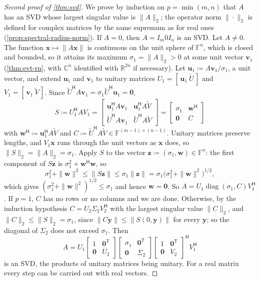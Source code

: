 \begin{proof}[Second proof of \cref{thm:svd}]
We prove by induction on $p=\min(m,n)$ that $A$ has an SVD whose largest singular value is $\|A\|_2$; the operator norm $\|\cdot\|_2$ is defined for complex matrices by the same supremum as for real ones (\cref{prop:spectral-radius-norm}). If $A=0$, then $A=I_m0I_n$ is an SVD. Let $A\ne0$. The function $\mathbf x\mapsto\|A\mathbf x\|$ is continuous on the unit sphere of $\mathbb F^n$, which is closed and bounded, so it attains its maximum $\sigma_1=\|A\|_2>0$ at some unit vector $\mathbf v_1$ (\cref{thm:evt-rn}, with $\mathbb C^n$ identified with $\mathbb R^{2n}$ if necessary). Let $\mathbf u_1\coloneqq A\mathbf v_1/\sigma_1$, a unit vector, and extend $\mathbf u_1$ and $\mathbf v_1$ to unitary matrices $U_1=[\,\mathbf u_1\ \tilde U\,]$ and $V_1=[\,\mathbf v_1\ \tilde V\,]$. Since $\tilde U^{\mathsf H}A\mathbf v_1=\sigma_1\tilde U^{\mathsf H}\mathbf u_1=\mathbf 0$,
\[
S\coloneqq U_1^{\mathsf H}AV_1=\begin{bmatrix}\mathbf u_1^{\mathsf H}A\mathbf v_1&\mathbf u_1^{\mathsf H}A\tilde V\\\tilde U^{\mathsf H}A\mathbf v_1&\tilde U^{\mathsf H}A\tilde V\end{bmatrix}=\begin{bmatrix}\sigma_1&\mathbf w^{\mathsf H}\\\mathbf 0&C\end{bmatrix}
\]
with $\mathbf w^{\mathsf H}\coloneqq\mathbf u_1^{\mathsf H}A\tilde V$ and $C\coloneqq\tilde U^{\mathsf H}A\tilde V\in\mathbb F^{(m-1)\times(n-1)}$. Unitary matrices preserve lengths, and $V_1\mathbf x$ runs through the unit vectors as $\mathbf x$ does, so $\|S\|_2=\|A\|_2=\sigma_1$. Apply $S$ to the vector $\mathbf z\coloneqq(\sigma_1,\mathbf w)\in\mathbb F^n$: the first component of $S\mathbf z$ is $\sigma_1^2+\mathbf w^{\mathsf H}\mathbf w$, so
\[
\sigma_1^2+\|\mathbf w\|^2\le\|S\mathbf z\|\le\sigma_1\|\mathbf z\|=\sigma_1\bigl(\sigma_1^2+\|\mathbf w\|^2\bigr)^{1/2},
\]
which gives $(\sigma_1^2+\|\mathbf w\|^2)^{1/2}\le\sigma_1$ and hence $\mathbf w=\mathbf 0$. So $A=U_1\operatorname{diag}(\sigma_1,C)V_1^{\mathsf H}$. If $p=1$, $C$ has no rows or no columns and we are done. Otherwise, by the induction hypothesis $C=U_2\Sigma_2V_2^{\mathsf H}$ with the largest singular value $\|C\|_2$, and $\|C\|_2\le\|S\|_2=\sigma_1$, since $\|C\mathbf y\|\le\|S(0,\mathbf y)\|$ for every $\mathbf y$; so the diagonal of $\Sigma_2$ does not exceed $\sigma_1$. Then
\[
A=U_1\begin{bmatrix}1&\mathbf 0^{\mathsf T}\\\mathbf 0&U_2\end{bmatrix}\begin{bmatrix}\sigma_1&\mathbf 0^{\mathsf T}\\\mathbf 0&\Sigma_2\end{bmatrix}\begin{bmatrix}1&\mathbf 0^{\mathsf T}\\\mathbf 0&V_2\end{bmatrix}^{\mathsf H}V_1^{\mathsf H}
\]
is an SVD, the products of unitary matrices being unitary. For a real matrix every step can be carried out with real vectors.
\end{proof}

